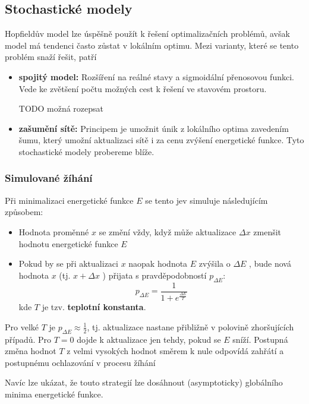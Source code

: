 \documentclass[11pt]{report} %
\numberwithin{equation}{section}
\begin{document}
\subsection{Stochastické modely}
Hopfieldův model lze úspěšně použít k řešení optimalizačních problémů, avšak model má tendenci často zůstat v lokálním optimu. Mezi varianty, které se tento problém snaží řešit, patří
\begin{itemize}
	
	
	\item \textbf{spojitý model:} Rozšíření na reálné stavy a sigmoidální přenosovou funkci. Vede ke zvětšení počtu možných cest k řešení ve stavovém prostoru. 
	
	TODO možná rozepsat
	
	\item \textbf{zašumění sítě:} Principem je umožnit únik z lokálního optima zavedením šumu, který umožní aktualizaci sítě i za cenu zvýšení energetické funkce. Tyto stochastické modely probereme blíže.
\end{itemize}

\subsubsection{Simulované žíhání}
Při minimalizaci energetické funkce $E$ se tento jev simuluje následujícím způsobem:
\begin{itemize}
	
	
	\item Hodnota proměnné $x$ se změní vždy, když může aktualizace $\Delta x$ zmenšit hodnotu energetické funkce $E$
	\item Pokud by se při aktualizaci $x$ naopak hodnota $E$ zvýšila o $\Delta E$ , bude nová hodnota $x$ (tj. $x + \Delta x$ ) přijata s pravděpodobností $p_{\Delta E}$:
	$$p_{\Delta E} = \frac{1}{1 + e^{\frac{\Delta E}{T}}}$$
	kde $T$ je tzv. \textbf{teplotní konstanta}.
\end{itemize}

Pro velké $T$ je $p_{\Delta E} \approx \frac{1}{2}$, tj. aktualizace nastane přibližně v polovině zhoršujících případů. Pro $T = 0$ dojde k aktualizace jen tehdy, pokud se $E$ sníží. Postupná změna hodnot $T$ z velmi vysokých hodnot směrem k nule odpovídá zahřátí a postupnému ochlazování v procesu žíhání

Navíc lze ukázat, že touto strategií lze dosáhnout (asymptoticky) globálního minima energetické funkce.
\end{document}
